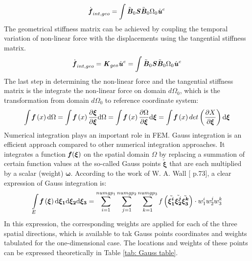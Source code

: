\begin{equation}
\dot{\textbf{\textit{f}}}_{int,geo} = \int \tilde{\textbf{\textit{B}}}_0 \textbf{\textit{S}} \tilde{\textbf{\textit{B}}}_0 \mathrm{\Omega_0} \dot{\textbf{\textit{u}}}^e
\end{equation}
The geometrical stiffness matrix can be achieved by coupling the temporal variation of non-linear force with the displacements using the tangential stiffness matrix.
\begin{equation}
\dot{\textbf{\textit{f}}}_{int,geo} = \textbf{\textit{K}}_{geo} \dot{\textbf{\textit{u}}}^e =\int \tilde{\textbf{\textit{B}}}_0 \textbf{\textit{S}} \tilde{\textbf{\textit{B}}}_0 \mathrm{\Omega_0} \dot{\textbf{\textit{u}}}^e
\end{equation}
The last step in determining the non-linear force and the tangential stiffness matrix is the integrate the non-linear force on domain $d\Omega_0$, which is the transformation from domain $d\Omega_0$ to reference coordinate system:
\begin{equation}
\int {\textbf{\textit{f}}}\left(x\right) \mathrm{d}\Omega = \int {\textbf{\textit{f}}}\left(x\right) \frac{\partial \boldsymbol{\xi}}{\partial \boldsymbol{\xi}} \mathrm{d}\Omega = \int {\textbf{\textit{f}}}\left(x\right) \frac{\partial \Omega}{\partial \boldsymbol{\xi}} \mathrm{d}\boldsymbol{\xi} = \int {\textbf{\textit{f}}}\left(x\right) det \left(\frac{\partial X}{\partial \boldsymbol{\xi}}\right) \mathrm{d}\boldsymbol{\xi}
\end{equation}
Numerical integration plays an important role in FEM. Gauss integration is an efficient approach compared to other numerical integration approaches. It integrates a function $\textbf{\textit{f}}(\boldsymbol{\xi})$ on the spatial domain $\Omega$ by replacing a summation of certain function values at the so-called Gauss points $\tilde{\boldsymbol{\xi}}$ that are each multiplied by a scalar (weight) $\boldsymbol{\omega}$.  According to the work of W. A. Wall [\cite{FiniteElement} p.73], a clear expression of Gauss integration is:
\begin{equation}
\int \limits_E {\textbf{\textit{f}}} \left(\boldsymbol{\xi}\right) \mathrm{d\boldsymbol{\xi_1}}\mathrm{d\boldsymbol{\xi_2}}\mathrm{d\boldsymbol{\xi_3}} = \displaystyle\sum_{i=1}^{numgp_1}\displaystyle\sum_{j=1}^{numgp_2} \displaystyle\sum_{k=1}^{numgp_3} f\left(\tilde{\boldsymbol{\xi_1^i}}\tilde{\boldsymbol{\xi_2^j}}\tilde{\boldsymbol{\xi_3^k}}\right)\cdot w_1^i w_2^j w_3^k
\end{equation}
In this expression, the corresponding weights are applied for each of the three spatial directions, which is available to tak Gauss points coordinates and weights tabulated for the one-dimensional case. The locations and weights of these points can be expressed theoretically in Table \ref{tab: Gauss table}.
	
